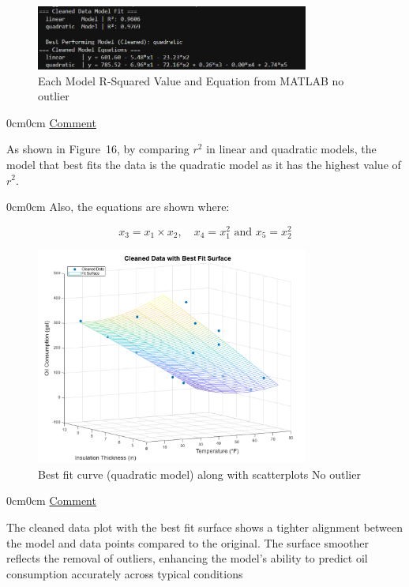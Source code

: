 \documentclass[12pt]{article}
\begin{document}
\begin{figure}[H]
    \centering
    \includegraphics[width=0.8\textwidth]{16.png}
    \caption{Each Model R-Squared Value and Equation from MATLAB no outlier}
\end{figure}
\begin{adjustwidth} {0cm}{0cm}
\uline{Comment}
\end{adjustwidth}
As shown in Figure~16, by comparing \( r^2 \) in linear and quadratic models, the model that best fits the data is the quadratic model as it has the highest value of \( r^2 \).\\
\begin{adjustwidth} {0cm}{0cm}
Also, the equations are shown where:
\end{adjustwidth}
\[
x_3 = x_1 \times x_2, \quad x_4 = x_1^2 \text{ and } x_5 = x_2^2
\]
\begin{figure}[H]
    \centering
    \includegraphics[width=0.8\textwidth]{17.png}
    \caption{Best fit curve (quadratic model) along with scatterplots No outlier}
\end{figure}
\begin{adjustwidth} {0cm}{0cm}
\uline{Comment}
\end{adjustwidth}
The cleaned data plot with the best fit surface shows a tighter alignment between the
model and data points compared to the original. The surface smoother reflects the
removal of outliers, enhancing the model’s ability to predict oil consumption accurately
across typical conditions
\end{document}
